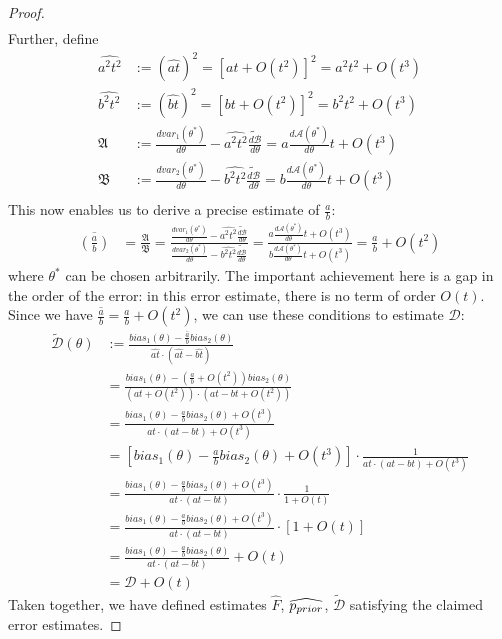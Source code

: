 \begin{proof}
\begin{align*}
    \end{align*}
    Further, define
    \begin{align*}
    \widehat{a^2t^2} &:= \left(\widehat{at}\right)^2 = \left[at + O(t^2)\right]^2 = a^2t^2 + O(t^3) \\
    \widehat{b^2t^2} &:= \left(\widehat{bt}\right)^2 = \left[bt + O(t^2)\right]^2 = b^2t^2 + O(t^3) \\
    \mathfrak{A} &:= \frac{d var_1(\theta^*)}{d \theta} - \widehat{a^2t^2} \tilde{\frac{d \mathcal{B}}{d \theta}} = a\frac{d \mathcal{A}(\theta^*)}{d \theta}t + O(t^3) \\
    \mathfrak{B} &:= \frac{d var_2(\theta^*)}{d \theta} - \widehat{b^2t^2} \tilde{\frac{d \mathcal{B}}{d \theta}} = b\frac{d \mathcal{A}(\theta^*)}{d \theta}t + O(t^3)\\
    \end{align*}    
    This now enables us to derive a precise estimate of $\frac{a}{b}$:
    \begin{align*}
    \overline{(\frac{a}{b})} &= \frac{\mathfrak{A}}{\mathfrak{B}} = \frac{\frac{d var_1(\theta^*)}{d \theta} - \widehat{a^2t^2} \tilde{\frac{d \mathcal{B}}{d \theta}}}{\frac{d var_2(\theta^*)}{d \theta} - \widehat{b^2t^2} \tilde{\frac{d \mathcal{B}}{d \theta}}} = \frac{a\frac{d \mathcal{A}(\theta^*)}{d \theta}t + O(t^3)}{b\frac{d \mathcal{A}(\theta^*)}{d \theta}t + O(t^3)} = \frac{a}{b}+O(t^2)
\end{align*}
where  $\theta^*$ can be chosen arbitrarily. 
The important achievement here is a gap in the order of the error: in this error estimate, there is no term of order $O(t)$.
Since we have $\overline{\frac{a}{b}} = \frac{a}{b} + O(t^2)$, we can use these conditions to estimate $\mathcal{D}$:
\begin{align*}
    \tilde{\mathcal{D}}(\theta) &:= \frac{bias_1(\theta) - \overline{\frac{a}{b}}bias_2(\theta)}{\widehat{at} \cdot (\widehat{at} - \widehat{bt})}\\
    &= \frac{bias_1(\theta) - (\frac{a}{b} + O(t^2))bias_2(\theta)}{(at+O(t^2)) \cdot (at - bt + O(t^2))}\\
    &= \frac{bias_1(\theta) - \frac{a}{b}bias_2(\theta) + O(t^3)}{at \cdot (at - bt) + O(t^3)}\\
    &= [bias_1(\theta) - \frac{a}{b}bias_2(\theta) + O(t^3)] \cdot \frac{1}{at \cdot (at - bt) + O(t^3)}\\
    &=\frac{bias_1(\theta) - \frac{a}{b}bias_2(\theta) + O(t^3)}{at \cdot (at - bt)} \cdot \frac{1}{1 + O(t)}\\
    &= \frac{bias_1(\theta) - \frac{a}{b}bias_2(\theta) + O(t^3)}{at \cdot (at - bt)} \cdot [1+O(t)]\\
    &= \frac{bias_1(\theta) - \frac{a}{b}bias_2(\theta)}{at \cdot (at - bt)} + O(t)\\
    &= \mathcal{D} + O(t)
\end{align*}
Taken together, we have defined estimates $\widehat{F}$, $\widehat{p_{prior}}$, $\tilde{\mathcal{D}}$ satisfying the claimed error estimates.
\end{proof}


